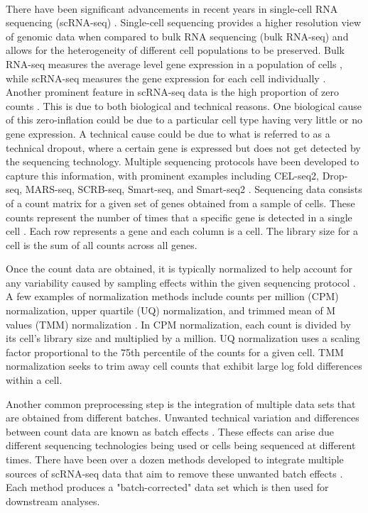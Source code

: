 \documentclass[
12pt, %
letterpaper, %
oneside, %
headinclude,footinclude, %
BCOR5mm, %
]{scrartcl}
\begin{document}
\paragraph*{}
There have been significant advancements in recent years in single-cell RNA sequencing (scRNA-seq) \citep{luecken2019current}. Single-cell sequencing provides a higher resolution view of genomic data when compared to bulk RNA sequencing (bulk RNA-seq) and allows for the heterogeneity of different cell populations to be preserved. Bulk RNA-seq measures the average level gene expression in a population of cells \citep{wang2009rna}, while scRNA-seq measures the gene expression for each cell individually \citep{wang2015advances}.
Another prominent feature in scRNA-seq data is the high proportion of zero counts \citep{vallejos2017normalizing}. This is due to both biological and technical reasons. One biological cause of this zero-inflation could be due to a particular cell type having very little or no gene expression. A technical cause could be due to what is referred to as a technical dropout, where a certain gene is expressed but does not get detected by the sequencing technology.
Multiple sequencing protocols have been developed to capture this information, with prominent examples including CEL-seq2, Drop-seq, MARS-seq, SCRB-seq, Smart-seq, and Smart-seq2 \citep{ziegenhain2017comparative}.
Sequencing data consists of a count matrix for a given set of genes obtained from a sample of cells. These counts represent the number of times that a specific gene is detected in a single cell \citep{grun2015design}. 
Each row represents a gene and each column is a cell. The library size for a cell is the sum of all counts across all genes. 

Once the count data are obtained, it is typically normalized to help account for any variability caused by sampling effects within the given sequencing protocol \citep{grun2015design}.
A few examples of normalization methods include counts per million (CPM) normalization, upper quartile (UQ) normalization, and trimmed mean of M values (TMM) normalization \citep{vallejos2017normalizing}. In CPM normalization, each count is divided by its cell's library size and multiplied by a million. UQ normalization uses a scaling factor proportional to the 75th percentile of the counts for a given cell. TMM normalization seeks to trim away cell counts that exhibit large log fold differences within a cell.

Another common preprocessing step is the integration of multiple data sets that are obtained from different batches. Unwanted technical variation and differences between count data are known as batch effects \citep{zhang2020combat}. These effects can arise due different sequencing technologies being used or cells being sequenced at different times.
There have been over a dozen methods developed to integrate multiple sources of scRNA-seq data that aim to remove these unwanted batch effects \citep{tran2020benchmark}. Each method produces a "batch-corrected" data set which is then used for downstream analyses.
\end{document}

